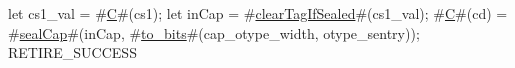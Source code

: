 let cs1_val = #\hyperref[sailRISCVzC]{C}#(cs1);
let inCap = #\hyperref[sailRISCVzclearTagIfSealed]{clearTagIfSealed}#(cs1_val);
#\hyperref[sailRISCVzC]{C}#(cd) = #\hyperref[sailRISCVzsealCap]{sealCap}#(inCap, #\hyperref[sailRISCVztozybits]{to\_bits}#(cap_otype_width, otype_sentry));
RETIRE_SUCCESS
